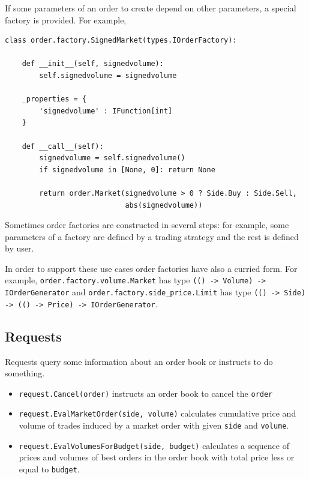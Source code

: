 \documentclass[a4paper,11pt]{article}
\begin{document}
If some parameters of an order to create depend on other parameters, a
special factory is provided. For example,

\begin{verbatim}
class order.factory.SignedMarket(types.IOrderFactory):

    def __init__(self, signedvolume):
        self.signedvolume = signedvolume

    _properties = {
        'signedvolume' : IFunction[int]
    }

    def __call__(self):
        signedvolume = self.signedvolume()
        if signedvolume in [None, 0]: return None

        return order.Market(signedvolume > 0 ? Side.Buy : Side.Sell,
                            abs(signedvolume))
\end{verbatim}

Sometimes order factories are constructed in several steps: for example,
some parameters of a factory are defined by a trading strategy and the
rest is defined by user.

In order to support these use cases order factories have also a curried
form. For example, \texttt{order.factory.volume.Market} has type
\texttt{(() -\textgreater{} Volume) -\textgreater{} IOrderGenerator} and
\texttt{order.factory.side\_price.Limit} has type
\texttt{(() -\textgreater{} Side) -\textgreater{} (() -\textgreater{} Price) -\textgreater{} IOrderGenerator}.

\subsection{Requests}\label{requests}

Requests query some information about an order book or instructs to do
something.

\begin{itemize}
\itemsep1pt\parskip0pt
\item
  \texttt{request.Cancel(order)} instructs an order book to cancel the
  \texttt{order}
\item
  \texttt{request.EvalMarketOrder(side, volume)} calculates cumulative
  price and volume of trades induced by a market order with given
  \texttt{side} and \texttt{volume}.
\item
  \texttt{request.EvalVolumesForBudget(side, budget)} calculates a
  sequence of prices and volumes of best orders in the order book with
  total price less or equal to \texttt{budget}.
\end{itemize}
\end{document}
